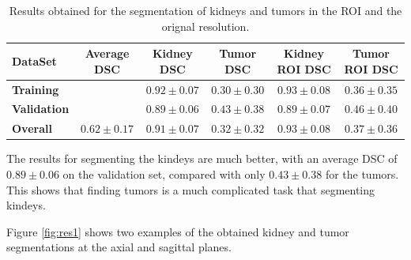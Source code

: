 \documentclass{article}
\begin{document}
\begin{table}[h]
    \centering

    \begin{tabular}{|l|c|c|c|c|c|}
        \hline 
        \textbf{DataSet} & \textbf{Average DSC } & \textbf{Kidney DSC } & \textbf{Tumor DSC } & \textbf{Kidney ROI DSC } & \textbf{Tumor ROI DSC }\\
        \hline 
        \textbf{Training} && $0.92\pm0.07$ & $0.30\pm0.30$ & $0.93\pm0.08$ & $0.36\pm0.35$ \\
        \hline 
        \textbf{Validation} && $0.89\pm0.06$ & $0.43\pm0.38$ & $0.89\pm0.07$ & $0.46\pm0.40$\\
        \hline 
        \textbf{Overall}  & $0.62\pm0.17$ & $0.91\pm0.07$ & $0.32\pm0.32$ & $0.93\pm0.08$ & $0.37\pm0.36$\\
        \hline 
    \end{tabular}

    \caption{Results obtained for the segmentation of kidneys and tumors in the ROI and the orignal resolution. }
    \label{table:res}
\end{table}

The results for segmenting the kindeys are much better, with an average DSC of $0.89\pm0.06$ on the validation set, compared
with only $0.43\pm0.38$ for the tumors. This shows that finding tumors is a much complicated task that segmenting kindeys. 

Figure \ref{fig:res1} shows two examples of the obtained kidney and tumor segmentations at the axial and sagittal planes. 
\end{document}
